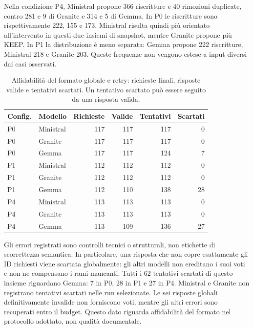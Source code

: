 Nella condizione P4, Ministral propone 366 riscritture e 40 rimozioni
duplicate, contro 281 e 9 di Granite e 314 e 5 di Gemma. In P0 le
riscritture sono rispettivamente 222, 155 e 173. Ministral risulta quindi
pi\`u orientato all'intervento in questi due insiemi di snapshot, mentre
Granite propone pi\`u KEEP. In P1 la distribuzione \`e meno separata:
Gemma propone 222 riscritture, Ministral 218 e Granite 203.
Queste frequenze non vengono estese a input diversi dai casi osservati.
\begin{table}[!htbp]
\centering\small
\caption{Affidabilit\`a del formato globale e retry: richieste finali, risposte valide e tentativi scartati. Un tentativo scartato pu\`o essere seguito da una risposta valida.}\label{tab:model-retry-dynamics}
\begin{tabular}{llrrrr}
\toprule
Config. & Modello & Richieste & Valide & Tentativi & Scartati \\
\midrule
P0 & Ministral & 117 & 117 & 117 & 0 \\
P0 & Granite & 117 & 117 & 117 & 0 \\
P0 & Gemma & 117 & 117 & 124 & 7 \\
P1 & Ministral & 112 & 112 & 112 & 0 \\
P1 & Granite & 112 & 112 & 112 & 0 \\
P1 & Gemma & 112 & 110 & 138 & 28 \\
P4 & Ministral & 113 & 113 & 113 & 0 \\
P4 & Granite & 113 & 113 & 113 & 0 \\
P4 & Gemma & 113 & 109 & 136 & 27 \\
\bottomrule
\end{tabular}
\end{table}
Gli errori registrati sono controlli tecnici o strutturali, non etichette
di scorrettezza semantica. In particolare, una risposta che non copre
esattamente gli ID richiesti viene scartata globalmente: gli altri modelli
non ereditano i suoi voti e non ne compensano i rami mancanti.
Tutti i 62 tentativi scartati di questo insieme riguardano Gemma:
7 in P0, 28 in P1 e 27 in P4. Ministral e Granite non registrano
tentativi scartati nelle run selezionate. Le sei risposte globali
definitivamente invalide non forniscono voti, mentre gli altri errori
sono recuperati entro il budget. Questo dato riguarda affidabilit\`a
del formato nel protocollo adottato, non qualit\`a documentale.

